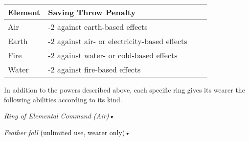 \begin{longtable}{llll}
\hline
\multicolumn{1}{|p{0.644in}|}{\begin{minipage}[t]{0.644in}\raggedright
\textbf{Element}\end{minipage}} & \multicolumn{1}{p{2.453in}|}{\begin{minipage}[t]{2.453in}\raggedright
\textbf{Saving Throw Penalty}\end{minipage}}\\
\hline
\multicolumn{1}{p{0.069in}|}{\begin{minipage}[t]{0.069in}\raggedright
Air\end{minipage}} & \multicolumn{1}{p{0.069in}|}{\begin{minipage}[t]{0.069in}\raggedright
-2 against earth-based effects\end{minipage}}\\
\hline
\multicolumn{1}{|p{0.644in}|}{\begin{minipage}[t]{0.644in}\raggedright
Earth\end{minipage}} & \multicolumn{1}{p{2.453in}|}{\begin{minipage}[t]{2.453in}\raggedright
-2 against air- or electricity-based effects\end{minipage}}\\
\hline
\multicolumn{1}{p{0.069in}|}{\begin{minipage}[t]{0.069in}\raggedright
Fire\end{minipage}} & \multicolumn{1}{p{0.069in}|}{\begin{minipage}[t]{0.069in}\raggedright
-2 against water- or cold-based effects\end{minipage}}\\
\hline
\multicolumn{1}{|p{0.644in}|}{\begin{minipage}[t]{0.644in}\raggedright
Water\end{minipage}} & \multicolumn{3}{p{2.592in}|}{\begin{minipage}[t]{2.592in}\raggedright
-2 against fire-based effects\end{minipage}}\\
\hline
\end{longtable}

In addition to the powers described above, each specific ring gives its wearer 
the following abilities according to its kind.

\textit{Ring of Elemental Command (Air)•}

\textit{Feather fall }(unlimited use, wearer only)•

